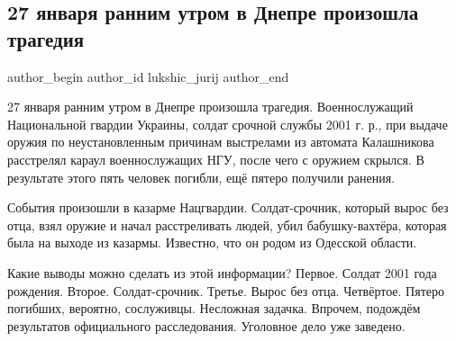  
 
 
 
 
 
\subsection{27 января ранним утром в Днепре произошла трагедия}
\label{sec:27_01_2022.fb.lukshic_jurij.1.tragedia_dnepr}
 
\ifcmt
 author_begin
   author_id lukshic_jurij
 author_end
\fi

27 января ранним утром в Днепре произошла трагедия. Военнослужащий Национальной
гвардии Украины, солдат срочной службы 2001 г. р., при выдаче оружия по
неустановленным причинам выстрелами из автомата Калашникова расстрелял караул
военнослужащих НГУ, после чего с оружием скрылся. В результате этого пять
человек погибли, ещё пятеро получили ранения.

События произошли в казарме Нацгвардии. Солдат-срочник, который вырос без отца,
взял оружие и начал расстреливать людей, убил бабушку-вахтёра, которая была на
выходе из казармы. Известно, что он родом из Одесской области.

Какие выводы можно сделать из этой информации? Первое. Солдат 2001 года
рождения. Второе. Солдат-срочник. Третье. Вырос без отца. Четвёртое. Пятеро
погибших, вероятно, сослуживцы. Несложная задачка. Впрочем, подождём
результатов официального расследования. Уголовное дело уже заведено.

